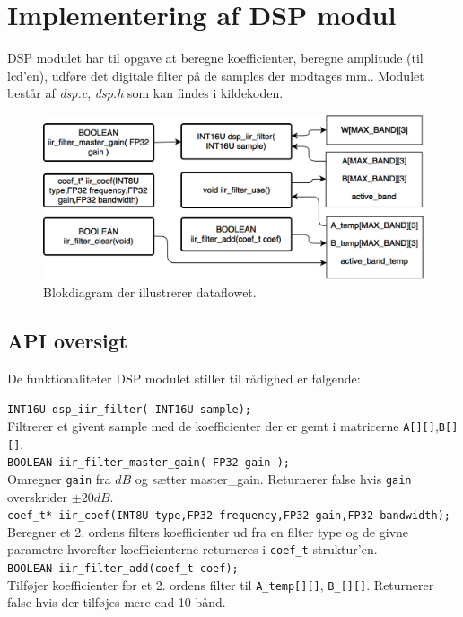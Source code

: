 \section{Implementering af DSP modul}\label{sec:implementering_dsp}
DSP modulet har til opgave at beregne koefficienter, beregne amplitude (til lcd'en), udføre det 
digitale filter på de samples der modtages mm.. 
Modulet består af \textit{dsp.c}, \textit{dsp.h} som kan findes i kildekoden. 


\begin{figure}[ht]
\centering
\includegraphics[scale = 0.3]{billeder/finalflow_dsp}
\caption{Blokdiagram der illustrerer dataflowet.}
\label{fig:data_flow_imp}
 \end{figure}


\subsection{API oversigt}
De funktionaliteter DSP modulet stiller til rådighed er følgende:

\texttt{INT16U dsp\_iir\_filter( INT16U sample);}\\
Filtrerer et givent sample med de koefficienter der er gemt i matricerne \texttt{A[][]},\texttt{B[][]}.\\

\texttt{BOOLEAN iir\_filter\_master\_gain( FP32 gain ); }\\
Omregner \texttt{gain} fra $dB$ og sætter master\_gain. Returnerer false hvis \texttt{gain} overskrider $\pm 20dB$.\\

\texttt{coef\_t* iir\_coef(INT8U type,FP32 frequency,FP32 gain,FP32 bandwidth);}\\
Beregner et 2. ordens filters koefficienter ud fra en filter type og de givne parametre hvorefter koefficienterne returneres i \texttt{coef\_t} struktur'en.\\

\texttt{BOOLEAN iir\_filter\_add(coef\_t coef);}\\
Tilføjer koefficienter for et 2. ordens filter til \texttt{A\_temp[][]}, \texttt{B\_[][]}. Returnerer false hvis der tilføjes mere end 10 bånd.\\

